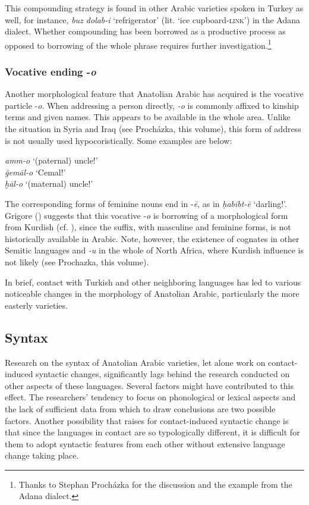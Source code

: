 \documentclass[output=paper]{langsci/langscibook}
\begin{document}
\noindent This compounding strategy is found in other Arabic varieties spoken in Turkey as well, for instance, \textit{buz dolab-i} `refrigerator' (lit. `ice cupboard-\textsc{link}') in the Adana dialect. Whether compounding has been borrowed as a productive process as opposed to borrowing of the whole phrase requires further investigation.\footnote{Thanks to Stephan Proch\'{a}zka for the discussion and the example from the Adana dialect.}



\subsubsection{Vocative ending -\textit{o}}
Another morphological feature that Anatolian Arabic has acquired is the vocative particle -\textit{o}. When addressing a person directly, \textit{-o} is commonly affixed to kinship terms and given names. This appears to be available in the whole area. Unlike the situation in Syria and Iraq (see Proch\'{a}zka, this volume), this form of address is not usually used hypocoristically. Some examples are below:

\ea
\noindent \textit{amm-o} `(paternal) uncle!'\\
\textit{ǧem\={a}l-o} `Cemal!'\\
\textit{ḫāl-o} `(maternal) uncle!'\\
\z

\noindent The corresponding forms of feminine nouns end in -\textit{\={e}}, as in \textit{ḥabībt-ē} `darling!'. Grigore (\citeyear[203]{Grigore2007book}) suggests that this vocative -\textit{o} is borrowing of a morphological form from Kurdish (cf. \citealt{HaigÖpengin2018}), since the suffix, with masculine and feminine forms, is not historically available in Arabic. Note, however, the existence of cognates in other Semitic languages and \textit{-u} in the whole of North Africa, where Kurdish influence is not likely (see Prochazka, this volume).

In brief, contact with Turkish and other neighboring languages has led to various noticeable changes in the morphology of Anatolian Arabic, particularly the more easterly varieties. 

\subsection{Syntax}
Research on the syntax of Anatolian Arabic varieties, let alone work on contact-induced syntactic changes, significantly lags behind the research conducted on other aspects of these languages. Several factors might have contributed to this effect. The researchers' tendency to focus on phonological or lexical aspects and the lack of sufficient data from which to draw conclusions  are two possible factors. Another possibility that \cite{Ingham2005} raises for contact-induced syntactic change is that since the languages in contact are so typologically different, it is difficult for them to adopt syntactic features from each other without extensive language change taking place. 
\end{document}
